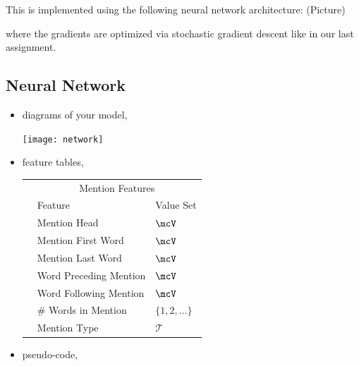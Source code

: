 \documentclass[11pt]{article}
\begin{document}
This is implemented using the following neural network architecture:
(Picture)

where the gradients are optimized via stochastic gradient descent like in our last assignment. 

\subsection{Neural Network}

\begin{itemize}
\item diagrams of your model,

  \begin{center}
    \texttt{[image: network]}
  \end{center}
\item feature tables,

  \begin{center}
    \begin{tabular}{@{}lll@{}}
      \toprule
      &\multicolumn{2}{c}{Mention Features  } \\
      & Feature & Value Set\\
      \midrule
      & Mention Head & $\mcV$ \\
      & Mention First Word & $\mcV$ \\
      & Mention Last Word & $\mcV$ \\
      & Word Preceding Mention & $\mcV$ \\
      & Word Following Mention & $\mcV$\\
      & \# Words in Mention & $\{1, 2, \ldots \}$ \\
      & Mention Type & $\mathcal{T}$ \\
      \bottomrule
    \end{tabular}
  \end{center}

\item pseudo-code,

  \begin{algorithmic}[1]
    \EndFor{}
    \EndFor{}
    \EndFor{}
    \EndFor{}
    \EndProcedure{}
  \end{algorithmic}

\end{itemize}
\end{document}
